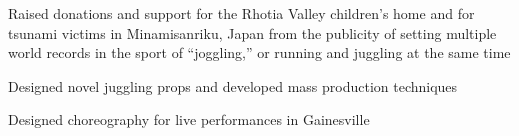 \documentclass[letterpaper]{article}
\begin{document}

\noindent{\Large\textbf {\\LEADERSHIP}}

\begin{compactitem}
	\item Raised donations and support for the Rhotia Valley children’s home and for tsunami victims in Minamisanriku, Japan from the publicity of setting multiple world records in the sport of “joggling,” or running and juggling at the same time
\end{compactitem}

\begin{compactitem}
	\item Designed novel juggling props and developed mass production techniques\\
	\item Designed choreography for live performances in Gainesville
\end{compactitem}



\noindent{\Large\textbf {\\AFFILIATIONS}}
\end{document}
